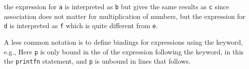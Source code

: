 

the expression for \lstinline|a| is interpreted as \lstinline|b| but gives the same results as \lstinline|c| since association does not matter for multiplication of numbers, but the expression for \lstinline|d| is interpreted as \lstinline|f| which is quite different from \lstinline|e|.

A less common notation is to define bindings for expressions using the  keyword, e.g.,
%
%
Here \lstinline|p| is only bound in the  of the expression following the  keyword, in this the \lstinline|printfn| statement, and \lstinline|p| is unbound in lines that follows.
\begin{comment}
  Here the use of indentation to define a sequence of expressions
  \fs{numbersInWIndentation}{The identifier \lstinline!p! is only bound in the nested scope following the keyword \keyword{in}.}
\end{comment}

